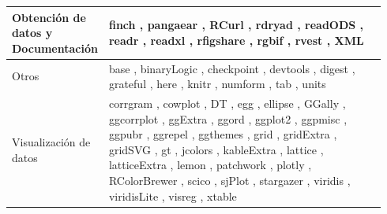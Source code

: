 \begin{table}
\begin{tabular}{>{\RaggedRight}m{0.14\linewidth}>{\RaggedRight}m{0.8\linewidth}}
Obtención de datos y Documentación & finch \autocite{finch}, pangaear \autocite{pangaear}, RCurl \autocite{RCurl}, rdryad \autocite{rdryad}, readODS \autocite{readODS}, readr \autocite{readr}, readxl \autocite{readxl}, rfigshare \autocite{rfigshare}, rgbif \autocite{rgbif}, rvest \autocite{rvest}, XML \autocite{XML} \\ \midrule
Otros & base \autocite{base}, binaryLogic \autocite{binaryLogic}, checkpoint \autocite{checkpoint}, devtools \autocite{devtools}, digest \autocite{digest}, grateful \autocite{grateful}, here \autocite{here}, knitr \autocite{knitr}, numform \autocite{numform}, tab \autocite{tab}, units \autocite{units} \\ \midrule
Visualización de datos & corrgram \autocite{corrgram}, cowplot \autocite{cowplot}, DT \autocite{DT}, egg \autocite{egg}, ellipse \autocite{ellipse}, GGally \autocite{GGally}, ggcorrplot \autocite{ggcorrplot}, ggExtra \autocite{ggExtra}, ggord \autocite{ggord}, ggplot2 \autocite{ggplot2}, ggpmisc \autocite{ggpmisc}, ggpubr \autocite{ggpubr}, ggrepel \autocite{ggrepel}, ggthemes \autocite{ggthemes}, grid \autocite{grid}, gridExtra \autocite{gridExtra}, gridSVG \autocite{gridSVG}, gt \autocite{gt}, jcolors \autocite{jcolors}, kableExtra \autocite{kableExtra}, lattice \autocite{lattice}, latticeExtra \autocite{latticeExtra}, lemon \autocite{lemon}, patchwork \autocite{patchwork}, plotly \autocite{plotly}, RColorBrewer \autocite{RColorBrewer}, scico \autocite{scico}, sjPlot \autocite{sjPlot}, stargazer \autocite{stargazer}, viridis \autocite{viridis}, viridisLite \autocite{viridisLite}, visreg \autocite{visreg}, xtable \autocite{xtable} \\ \bottomrule
\end{tabular}
\end{table}


